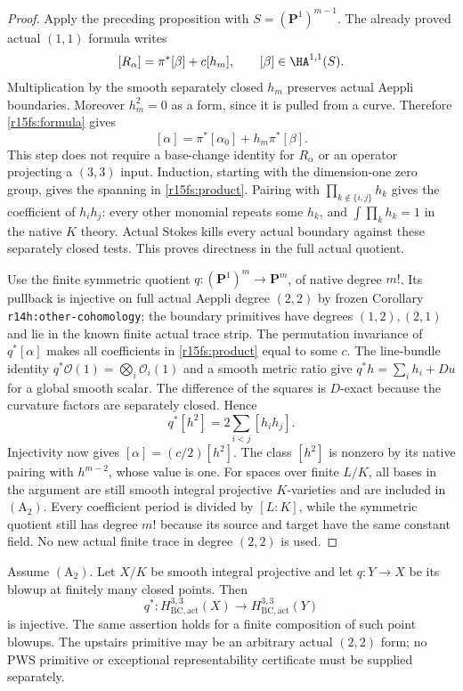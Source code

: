 \begin{proof}
Apply the preceding proposition with
$S=(\mathbf P^1)^{m-1}$. The already proved actual
$(1,1)$ formula writes
\[
            [R_\alpha]=\pi^*[\beta]+c[h_m],
                 \qquad [\beta]\in\HA^{1,1}(S).
\]
Multiplication by the smooth separately closed $h_m$
preserves actual Aeppli boundaries. Moreover $h_m^2=0$
as a form, since it is pulled from a curve. Therefore
\eqref{r15fs:formula} gives
\[
           [\alpha]=\pi^*[\alpha_0]+h_m\pi^*[\beta].
\tag{FX15.7}\label{r15fs:induction}
\]
This step does not require a base-change identity for
$R_\alpha$ or an operator projecting a $(3,3)$ input.
Induction, starting with the dimension-one zero group,
gives the spanning in \eqref{r15fs:product}.
Pairing with $\prod_{k\notin\{i,j\}}h_k$ gives the
coefficient of $h_i h_j$: every other monomial repeats
some $h_k$, and $\int\prod_kh_k=1$ in the native
$K$ theory. Actual Stokes kills every actual boundary
against these separately closed tests. This proves
directness in the full actual quotient.

Use the finite symmetric quotient
$q:(\mathbf P^1)^m\to\mathbf P^m$, of native degree
$m!$. Its pullback is injective on full actual Aeppli
degree $(2,2)$ by frozen Corollary
\texttt{r14h:other-cohomology}; the boundary primitives
have degrees $(1,2),(2,1)$ and lie in the known finite
actual trace strip. The permutation invariance of
$q^*[\alpha]$ makes all coefficients in
\eqref{r15fs:product} equal to some $c$.
The line-bundle identity $q^*\mathcal O(1)=
\bigotimes_i\mathcal O_i(1)$ and a smooth metric ratio
give $q^*h=\sum_i h_i+Du$ for a global smooth scalar.
The difference of the squares is $D$-exact because
the curvature factors are separately closed. Hence
\[
                  q^*[h^2]=2\sum_{i<j}[h_i h_j].
\]
Injectivity now gives $[\alpha]=(c/2)[h^2]$.
The class $[h^2]$ is nonzero by its native pairing
with $h^{m-2}$, whose value is one.
For spaces over finite $L/K$, all bases in the argument
are still smooth integral projective $K$-varieties and
are included in $(\mathrm A_2)$. Every coefficient
period is divided by $[L:K]$, while the symmetric
quotient still has degree $m!$ because its source and
target have the same constant field. No new actual
finite trace in degree $(2,2)$ is used.
\end{proof}

\begin{corollary}
\label{r15fs:point-blowups}
Assume $(\mathrm A_2)$. Let $X/K$ be smooth integral
projective and let $q:Y\to X$ be its blowup at finitely
many closed points. Then
\[
 q^*:H_{\mathrm{BC,act}}^{3,3}(X)
                      \longrightarrow H_{\mathrm{BC,act}}^{3,3}(Y)
\tag{FX15.8}\label{r15fs:point-BC}
\]
is injective. The same assertion holds for a finite
composition of such point blowups. The upstairs
primitive may be an arbitrary actual $(2,2)$ form;
no PWS primitive or exceptional representability
certificate must be supplied separately.
\end{corollary}


